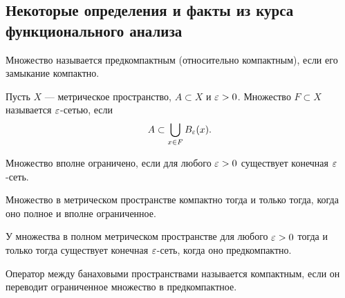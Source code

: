 
\subsection*{Некоторые определения и факты из курса функционального анализа}

\begin{definition}
Множество называется предкомпактным (относительно компактным), если его замыкание компактно.
\end{definition}

\begin{definition} Пусть $X$ --- метрическое пространство, $A \subset X$ и $\varepsilon > 0$. Множество  $F \subset X$ называется $\varepsilon$-сетью, если
$$ A \subset \bigcup_{x \in F} B_\varepsilon (x).$$
\end{definition}

\begin{definition}
Множество вполне ограничено, если для любого $\varepsilon > 0$ существует конечная $\varepsilon$-сеть.
\end{definition}

\begin{theorem}[Хаусдорф]
Множество в метрическом пространстве компактно тогда и только тогда, когда оно полное и вполне ограниченное. 
\end{theorem}

\begin{corollary}
У множества в полном метрическом пространстве для любого $\varepsilon > 0$ тогда и только тогда существует конечная $\varepsilon$-сеть, когда оно предкомпактно.
\end{corollary}

\begin{definition}
Оператор между банаховыми пространствами называется компактным, если он переводит ограниченное множество в предкомпактное.
\end{definition}

